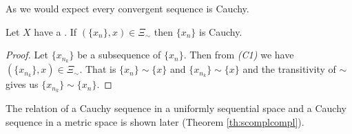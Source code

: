 As we would expect every convergent sequence is Cauchy.

\begin{theorem}\label{th:cauchconvg}
Let $X$ have a \uss. If $(\{x_n\}, x)\in\Xi_\sim$ then $\{x_n\}$ is Cauchy.
\end{theorem}
\begin{proof}
Let $\{x_{n_k}\}$ be a subsequence of $\{x_n\}$. Then from \emph{(C1)} we have $(\{x_{n_k}\}, x)\in\Xi_\sim$. That is $\{x_n\} \sim \{x\}$ and $\{x_{n_k}\} \sim \{x\}$ and the transitivity of $\sim$ gives us $\{x_{n_k}\} \sim \{x_n\}$.
\end{proof}

The relation of a Cauchy sequence in a uniformly sequential space and a Cauchy sequence in a metric space is shown later (Theorem \ref{th:scomplcompl}).





















